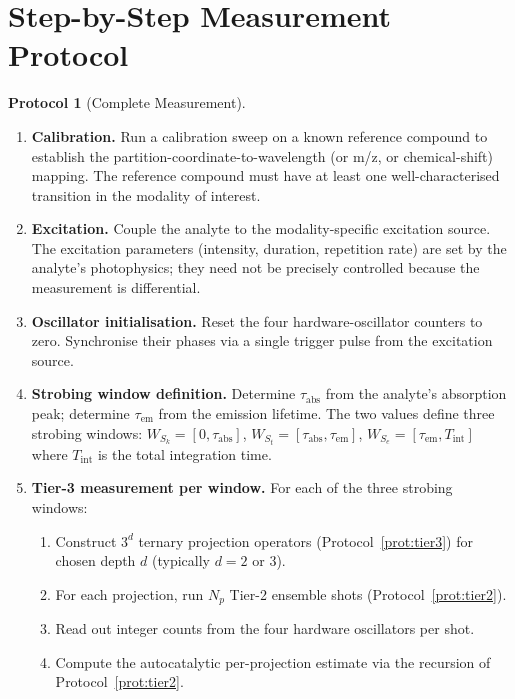\documentclass[twocolumn,11pt,a4paper]{article}
\theoremstyle{thmstyle}
\theoremstyle{axiomstyle}
\theoremstyle{definition}
\newtheorem{protocol}[theorem]{Protocol}
\theoremstyle{remark}
\begin{document}
\section{Step-by-Step Measurement Protocol}
\label{sec:methods_protocol}

\begin{protocol}[Complete Measurement]\label{prot:complete}
\begin{enumerate}[label=\textbf{Step \arabic*:},leftmargin=*]
\item \textbf{Calibration.} Run a calibration sweep on a known reference compound to establish the partition-coordinate-to-wavelength (or m/z, or chemical-shift) mapping. The reference compound must have at least one well-characterised transition in the modality of interest.

\item \textbf{Excitation.} Couple the analyte to the modality-specific excitation source. The excitation parameters (intensity, duration, repetition rate) are set by the analyte's photophysics; they need not be precisely controlled because the measurement is differential.

\item \textbf{Oscillator initialisation.} Reset the four hardware-oscillator counters to zero. Synchronise their phases via a single trigger pulse from the excitation source.

\item \textbf{Strobing window definition.} Determine $\tau_{\mathrm{abs}}$ from the analyte's absorption peak; determine $\tau_{\mathrm{em}}$ from the emission lifetime. The two values define three strobing windows: $W_{S_{k}}=[0,\tau_{\mathrm{abs}}]$, $W_{S_{t}}=[\tau_{\mathrm{abs}},\tau_{\mathrm{em}}]$, $W_{S_{e}}=[\tau_{\mathrm{em}},T_{\mathrm{int}}]$ where $T_{\mathrm{int}}$ is the total integration time.

\item \textbf{Tier-3 measurement per window.} For each of the three strobing windows:
  \begin{enumerate}[label=(\alph*),nosep]
  \item Construct $3^{d}$ ternary projection operators (Protocol~\ref{prot:tier3}) for chosen depth $d$ (typically $d=2$ or $3$).
  \item For each projection, run $N_{p}$ Tier-2 ensemble shots (Protocol~\ref{prot:tier2}).
  \item Read out integer counts from the four hardware oscillators per shot.
  \item Compute the autocatalytic per-projection estimate via the recursion of Protocol~\ref{prot:tier2}.
  \end{enumerate}


\end{enumerate}
\end{protocol}
\end{document}
